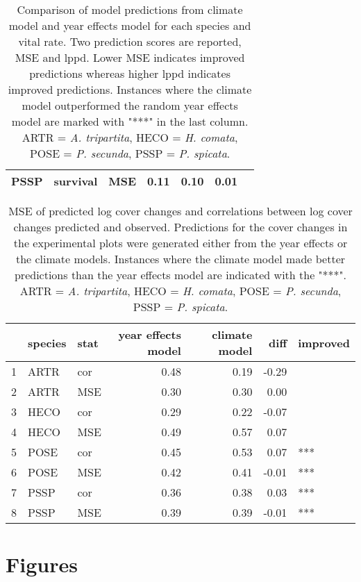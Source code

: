 \documentclass[11pt]{article}
\begin{document}
\begin{table}[ht]
\begin{tabular}{lllrrrl}
		PSSP & survival & MSE & 0.11 & 0.10 & 0.01 &  \\ 
		\hline
	\end{tabular}
	\caption{Comparison of model predictions from climate model and year effects model for each species and vital rate.  Two prediction scores are reported, MSE and lppd. Lower MSE indicates improved predictions whereas higher lppd indicates improved predictions.  Instances where the climate model outperformed the random year effects model are marked with "***" in the last column. ARTR = \textit{A. tripartita}, HECO = \textit{H. comata}, POSE = \textit{P. secunda}, PSSP = \textit{P. spicata}.} 
	\label{table:overallPreds}
\end{table}


\begin{table}[ht]
	\centering
	\begin{tabular}{rllrrrl}
		\hline
		& species & stat & year effects model & climate model & diff & improved \\ 
		\hline
		1 & ARTR & cor & 0.48 & 0.19 & -0.29 &  \\ 
		2 & ARTR & MSE & 0.30 & 0.30 & 0.00 &  \\ 
		3 & HECO & cor & 0.29 & 0.22 & -0.07 &  \\ 
		4 & HECO & MSE & 0.49 & 0.57 & 0.07 &  \\ 
		5 & POSE & cor & 0.45 & 0.53 & 0.07 & *** \\ 
		6 & POSE & MSE & 0.42 & 0.41 & -0.01 & *** \\ 
		7 & PSSP & cor & 0.36 & 0.38 & 0.03 & *** \\ 
		8 & PSSP & MSE & 0.39 & 0.39 & -0.01 & *** \\ 
		\hline
	\end{tabular}
	\caption{MSE of predicted log cover changes and correlations between log cover changes predicted and observed. Predictions for the cover changes in the experimental plots were generated either from the year effects or the climate models. Instances where the climate model made better predictions than the year effects model are indicated with the "***". ARTR = \textit{A. tripartita}, HECO = \textit{H. comata}, POSE = \textit{P. secunda}, PSSP = \textit{P. spicata}.} 
	\label{table:corPGR}
\end{table}


\clearpage
\newpage


\section*{Figures}
\end{document}
